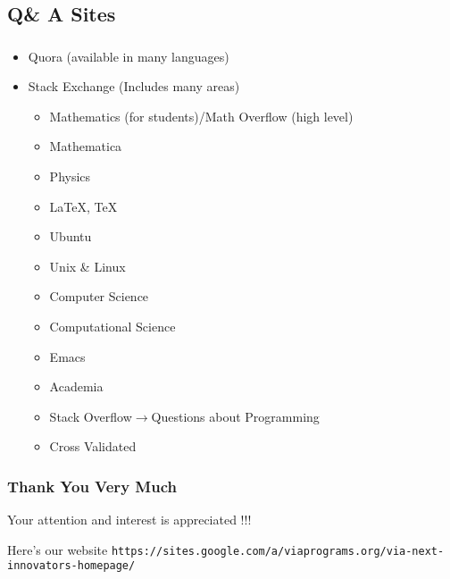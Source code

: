 \documentclass[dvipdfmx,10pt]{beamer}
\newcommand{\bb}{\begin{block}}
\newcommand{\eb}{\end{block}}
\newcommand{\ft}{\frametitle}
\newcommand{\bit}{\begin{itemize}}
\newcommand{\eit}{\end{itemize}}
\begin{document}
\subsection{Q\& A Sites}
\begin{frame}\ft{\insertsubsection}
\footnotesize
\bb{\insertsubsection}
\bit
\item Quora (available in many languages)
\item Stack Exchange (Includes many areas)
\bit
\item Mathematics (for students)/Math Overflow (high level)
\item Mathematica
\item Physics
\item \LaTeX, \TeX
\item Ubuntu
\item Unix \& Linux
\item Computer Science
\item Computational Science
\item Emacs
\item Academia
\item Stack Overflow$\to$Questions about Programming 
\item Cross Validated
\eit
\eit
\eb
\normalsize
\end{frame}
\begin{frame}\ft{Thank You Very Much}
Your attention and interest is appreciated !!!
\bb{Here's our website}
\footnotesize
\texttt{https://sites.google.com/a/viaprograms.org/via-next-innovators-homepage/}
\normalsize
\eb
\end{frame}
\end{document}
